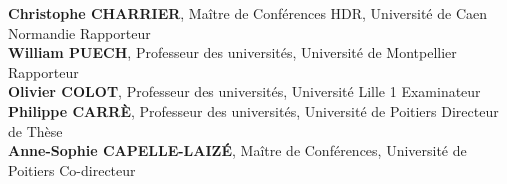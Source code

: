 \begin{titlepage}
\begin{myFont}
\textbf{Christophe CHARRIER}, Maître de Conférences HDR, Université de Caen Normandie \dotfill Rapporteur\\
\vspace{0.2cm}
\textbf{William PUECH},  Professeur des universités, Université de Montpellier \dotfill Rapporteur\\
\vspace{0.2cm}
\textbf{Olivier COLOT}, Professeur des universités, Université Lille 1 \dotfill Examinateur\\


 \vspace{0.2cm}
\textbf{Philippe CARRÈ}, Professeur des universités, Université de Poitiers \dotfill Directeur de Thèse\\
\vspace{0.2cm}
\textbf{Anne-Sophie CAPELLE-LAIZ\'E}, Maître de Conférences, Université de Poitiers \dotfill Co-directeur 
\end{myFont}
  \end{titlepage}


\restoregeometry